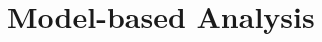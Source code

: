 \documentclass[10pt,letterpaper]{article}
\begin{document}




\section{Model-based Analysis}
\end{document}
